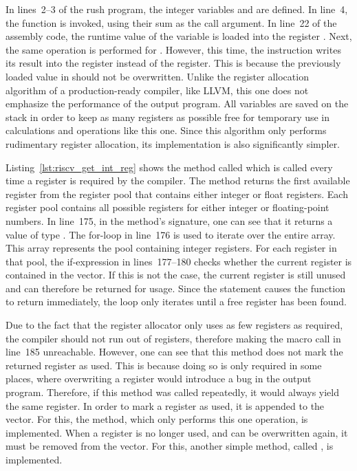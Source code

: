 In lines~2--3 of the rush program, the integer variables  and  are defined.
In line~4, the  function is invoked, using their sum as the call argument.
In line~22 of the assembly code, the runtime value of the variable  is loaded into the register .
Next, the same operation is performed for .
However, this time, the instruction writes its result into the  register instead of the  register.
This is because the previously loaded value in  should not be overwritten.
Unlike the register allocation algorithm of a production-ready compiler, like LLVM,
this one does not emphasize the performance of the output program.
All variables are saved on the stack in order to keep as many registers as possible free for temporary use in calculations and operations like this one.
Since this algorithm only performs rudimentary register allocation, its implementation is also significantly simpler.


Listing~\ref{lst:riscv_get_int_reg} shows the method called  which is called every time a register is required by the compiler.
The method returns the first available register from the register pool that contains either integer or float registers.
Each register pool contains all possible registers for either integer or floating-point numbers.
In line~175, in the method's signature, one can see that it returns a value of type .
The for-loop in line~176 is used to iterate over the entire  array.
This array represents the pool containing integer registers.
For each register in that pool, the if-expression in lines~177--180 checks whether the current register  is contained in the  vector.
If this is not the case, the current register is still unused and can therefore be returned for usage.
Since the  statement causes the function to return immediately,
the loop only iterates until a free register has been found.

Due to the fact that the register allocator only uses as few registers as required,
the compiler should not run out of registers,
therefore making the  macro call in line~185 unreachable.
However, one can see that this method does not mark the returned register as used.
This is because doing so is only required in some places, where overwriting a register would introduce a bug in the output program.
Therefore, if this method was called repeatedly, it would always yield the same register.
In order to mark a register as used, it is appended to the  vector.
For this, the  method, which only performs this one operation, is implemented.
When a register is no longer used, and can be overwritten again, it must be removed from the  vector.
For this, another simple method, called , is implemented.

